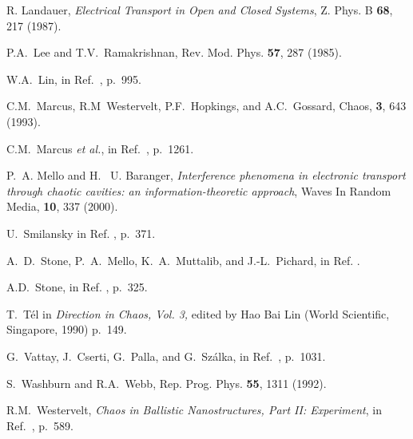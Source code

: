 \documentclass[a4paper,10pt]{article}
\begin{document}
\begin{thebibliography}{Cucc~02b}
R. Landauer, 
{\it Electrical Transport in Open and Closed Systems},
Z. Phys. B {\bf 68}, 217 (1987).

 P.A.~Lee and T.V.~Ramakrishnan, Rev. Mod. Phys. 
{\bf 57}, 287 (1985).

W.A.~Lin, in Ref.~\cite{csf}, p.~995.

C.M.~Marcus, R.M~Westervelt, P.F.~Hopkings,
and A.C.~Gossard, Chaos, {\bf 3}, 643 (1993).

C.M.~Marcus {\em et al.}, in Ref.~\cite{csf}, p.~1261.

P.\ A. Mello and H. \ U. Baranger, 
{\it Interference phenomena in electronic transport through chaotic cavities: an information-theoretic approach}, 
Waves In Random Media, {\bf 10}, 337 (2000).

U.~Smilansky in Ref. \cite{LesHou89}, p.~371.

A.~D.~Stone, P.~A.~Mello, K.~A.~Muttalib, and J.-L.~Pichard,
in Ref. \cite{ALWrev}.

A.D.~Stone, in Ref. \cite{LesHou94}, p.~325.

T.~T\'el in {\it Direction in Chaos, Vol. 3,} edited by Hao 
Bai Lin (World Scientific, Singapore, 1990) p.~149.

G.~Vattay, J.~Cserti, G.~Palla, and G.~Sz\'alka,
in Ref.~\cite{csf}, p.~1031.

S.~Washburn and R.A.~Webb, Rep. Prog. Phys. {\bf 55}, 1311 (1992).

 R.M.~Westervelt,
{\it Chaos in Ballistic Nanostructures, Part II: Experiment}, in Ref.~\cite{timp95}, p.~589.

\end{thebibliography}
\end{document}
